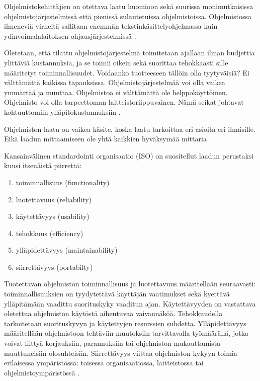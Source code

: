 \documentclass[finnish]{tktltiki2}
\theoremstyle{definition}
\theoremstyle{remark}
\begin{document}
Ohjelmistokehittäjien on otettava laatu huomioon sekä suurissa monimutkaisissa ohjelmistojärjestelmissä että pienissä sulautetuissa ohjelmistoissa. Ohjelmistossa ilmeneviä virheitä sallitaan enemmän tekstinkäsittelyohjelmassa kuin ydinvoimalalaitoksen ohjausjärjestelmissä \cite{KIP96}.

Oletetaan, että tilattu ohjelmistojärjestelmä toimitetaan ajallaan ilman budjettia ylittäviä kustannuksia, ja se toimii oikein sekä suorittaa tehokkaasti sille määritetyt toiminnallisuudet. Voidaanko tuotteeseen tällöin olla tyytyväisiä? Ei välttämättä kaikissa tapauksissa. Ohjelmistojärjestelmää voi olla vaikea ymmärtää ja muuttaa. Ohjelmistoa ei välttämättä ole helppokäyttöinen. Ohjelmisto voi olla tarpeettoman laitteistoriippuvainen. Nämä seikat johtavat kohtuuttomiin ylläpitokustannuksiin \cite{BBL76}.

Ohjelmiston laatu on vaikea käsite, koska laatu tarkoittaa eri asioita eri ihmisille. Eikä laadun mittaamiseen ole yhtä kaikkien hyväksymää mittaria \cite{KIP96}.        

Kansainvälinen standardointi organisaatio (ISO) on suositellut laadun perustaksi kuusi itsenäistä piirrettä:

\begin{enumerate}
  \item toiminnallisuus (functionality)
  \item luotettavuus (reliability)
  \item käytettävyys (usability)
  \item tehokkuus (efficiency)
  \item ylläpidettävyys (maintainability)
  \item siirrettävyys (portabilty) \cite{KIP96}
\end{enumerate}

Tuotettavan ohjelmiston toiminnallisuus ja luotettavuus määritellään seuraavasti: toiminnallisuuksien on tyydytettävä käyttäjän vaatimukset sekä kyettävä ylläpitämään vaadittu suorituskyky vaaditun ajan. Käytettävyyden on vastattava oletettua ohjelmiston käytöstä aiheutuvaa vaivannäköä. Tehokkuudella tarkoitetaan suorituskyvyn ja käytettyjen resurssien suhdetta. Ylläpidettävyys määritellään ohjelmistoon tehtäviin muutoksiin tarvittavalla työmäärällä, jotka voivat liittyä korjauksiin, parannuksiin tai ohjelmiston mukauttamista muuttuneisiin olosuhteisiin. Siirrettävyys viittaa ohjelmiston kykyyn toimia erilaisessa ympäristössä: toisessa organisaatiossa, laitteistossa tai ohjelmistoympäristössä \cite{KIP96}.
\end{document}
